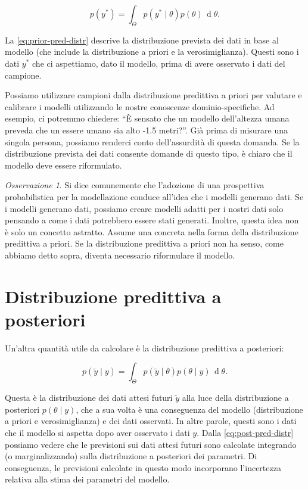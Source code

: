 \documentclass[
  11pt,
]{krantz}
\theoremstyle{definition}
\theoremstyle{definition}
\theoremstyle{definition}
\theoremstyle{definition}
\theoremstyle{remark}
\newtheorem*{remark}{Osservazione}
\begin{document}
\begin{equation}
p(y^*) = \int_\Theta p(y^* \mid \theta) p(\theta) \,\operatorname {d}\!\theta .
\label{eq:prior-pred-distr}
\end{equation}

La \eqref{eq:prior-pred-distr} descrive la distribuzione prevista dei dati in base al modello (che include la distribuzione a priori e la verosimiglianza). Questi sono i dati \(y^*\) che ci aspettiamo, dato il modello, prima di avere osservato i dati del campione.

Possiamo utilizzare campioni dalla distribuzione predittiva a priori per valutare e calibrare i modelli utilizzando le nostre conoscenze dominio-specifiche. Ad esempio, ci potremmo chiedere: ``È sensato che un modello dell'altezza umana preveda che un essere umano sia alto -1.5 metri?''. Già prima di misurare una singola persona, possiamo renderci conto dell'assurdità di questa domanda. Se la distribuzione prevista dei dati consente domande di questo tipo, è chiaro che il modello deve essere riformulato.

\begin{remark}
Si dice comunemente che l'adozione di una prospettiva probabilistica per la modellazione conduce all'idea che i modelli generano dati. Se i modelli generano dati, possiamo creare modelli adatti per i nostri dati solo pensando a come i dati potrebbero essere stati generati. Inoltre, questa idea non è solo un concetto astratto. Assume una concreta nella forma della distribuzione predittiva a priori. Se la distribuzione predittiva a priori non ha senso, come abbiamo detto sopra, diventa necessario riformulare il modello.
\end{remark}

\hypertarget{distribuzione-predittiva-a-posteriori}{%
\section{Distribuzione predittiva a posteriori}\label{distribuzione-predittiva-a-posteriori}}

Un'altra quantità utile da calcolare è la distribuzione predittiva a posteriori:

\begin{equation}
p(\tilde{y} \mid y) = \int_\Theta p(\tilde{y} \mid \theta) p(\theta \mid y) \,\operatorname {d}\!\theta .
\label{eq:post-pred-distr}
\end{equation}

Questa è la distribuzione dei dati attesi futuri \(\tilde{y}\) alla luce della distribuzione a posteriori \(p(\theta \mid y)\), che a sua volta è una conseguenza del modello (distribuzione a priori e verosimiglianza) e dei dati osservati. In altre parole, questi sono i dati che il modello si aspetta dopo aver osservato i dati \(y\). Dalla \eqref{eq:post-pred-distr} possiamo vedere che le previsioni sui dati attesi futuri sono calcolate integrando (o marginalizzando) sulla distribuzione a posteriori dei parametri. Di conseguenza, le previsioni calcolate in questo modo incorporano l'incertezza relativa alla stima dei parametri del modello.
\end{document}
